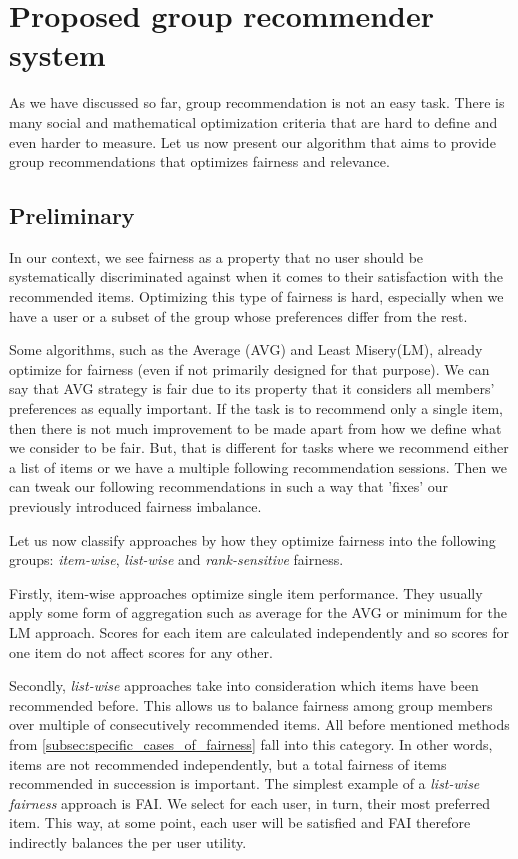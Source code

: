 \chapter{Proposed group recommender system}  \label{chap:our_work}

As we have discussed so far, group recommendation is not an easy task. There is many social and mathematical optimization criteria that are hard to define and even harder to measure. Let us now present our algorithm that aims to provide group recommendations that optimizes fairness and relevance.

\section{Preliminary}

In our context, we see fairness as a property that no user should be systematically discriminated against when it comes to their satisfaction with the recommended items. Optimizing this type of fairness is hard, especially when we have a user or a subset of the group whose preferences differ from the rest.

Some algorithms, such as the Average (AVG) and Least Misery(LM), already optimize for fairness (even if not primarily designed for that purpose). We can say that AVG strategy is fair due to its property that it considers all members' preferences as equally important. If the task is to recommend only a single item, then there is not much improvement to be made apart from how we define what we consider to be fair.  But, that is different for tasks where we recommend either a list of items or we have a multiple following recommendation sessions. Then we can tweak our following recommendations in such a way that 'fixes' our previously introduced fairness imbalance.

Let us now classify approaches by how they optimize fairness into the following groups: \textit{item-wise}, \textit{list-wise} and \textit{rank-sensitive} fairness.

Firstly, item-wise approaches optimize single item performance. They usually apply some form of aggregation such as average for the AVG or minimum for the LM approach. Scores for each item are calculated independently and so scores for one item do not affect scores for any other.

Secondly, \textit{list-wise} approaches take into consideration which items have been recommended before. This allows us to balance fairness among group members over multiple of consecutively recommended items. All before mentioned methods from \ref{subsec:specific_cases_of_fairness} fall into this category. In other words, items are not recommended independently, but a total fairness of items recommended in succession is important. The simplest example of a \textit{list-wise fairness} approach is FAI. We select for each user, in turn, their most preferred item. This way, at some point, each user will be satisfied and FAI therefore indirectly balances the per user utility.

